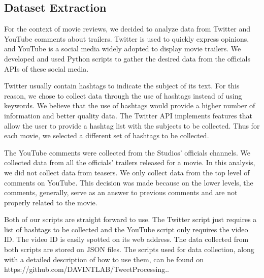 
\subsection{Dataset Extraction}
\label{sec:datasetCollection}

For the context of movie reviews, we decided to analyze data from Twitter and YouTube comments about trailers. Twitter is used to quickly express opinions, and YouTube is a social media widely adopted to display movie trailers. We developed and used Python scripts to gather the desired data from the officials APIs of these social media. 

Twitter usually contain hashtags to indicate the subject of its text. For this reason, we chose to collect data through the use of hashtags instead of using keywords. We believe that the use of hashtags would provide a higher number of information and better quality data. The Twitter API implements features that allow the user to provide a hashtag list with the subjects to be collected. Thus for each movie, we selected a different set of hashtags to be collected. 

The YouTube comments were collected from the Studios' officials channels. We collected data from all the officials' trailers released for a movie. In this analysis, we did not collect data from teasers. We only collect data from the top level of comments on YouTube. This decision was made because on the lower levels, the comments, generally, serve as an answer to previous comments and are not properly related to the movie. 

Both of our scripts are straight forward to use. The Twitter script just requires a list of hashtags to be collected and the YouTube script only requires the video ID. The video ID is easily spotted on its web address. The data collected from both scripts are stored on JSON files. The scripts used for data collection, along with a detailed description of how to use them, can be found on https://github.com/DAVINTLAB/TweetProcessing..

